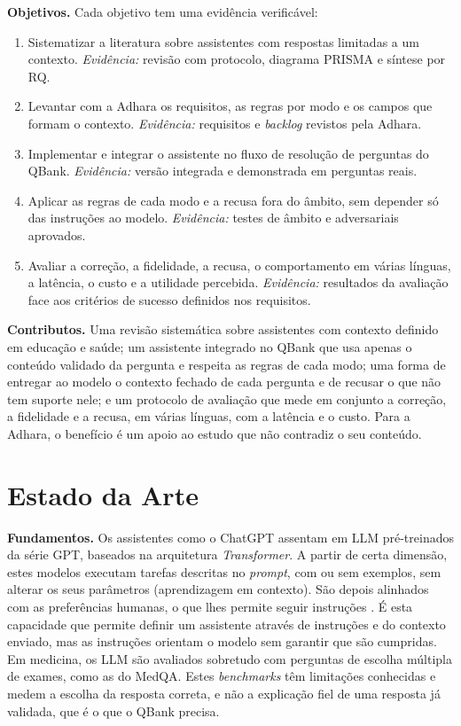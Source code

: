 \documentclass[11pt,a4paper]{article}
\begin{document}
\textbf{Objetivos.} Cada objetivo tem uma evidência verificável:
\begin{enumerate}[label=O\arabic*., leftmargin=1.2cm]
    \item Sistematizar a literatura sobre assistentes com respostas limitadas a um contexto. \emph{Evidência:} revisão com protocolo, diagrama PRISMA e síntese por RQ.
    \item Levantar com a Adhara os requisitos, as regras por modo e os campos que formam o contexto. \emph{Evidência:} requisitos e \emph{backlog} revistos pela Adhara.
    \item Implementar e integrar o assistente no fluxo de resolução de perguntas do QBank. \emph{Evidência:} versão integrada e demonstrada em perguntas reais.
    \item Aplicar as regras de cada modo e a recusa fora do âmbito, sem depender só das instruções ao modelo. \emph{Evidência:} testes de âmbito e adversariais aprovados.
    \item Avaliar a correção, a fidelidade, a recusa, o comportamento em várias línguas, a latência, o custo e a utilidade percebida. \emph{Evidência:} resultados da avaliação face aos critérios de sucesso definidos nos requisitos.
\end{enumerate}

\textbf{Contributos.} Uma revisão sistemática sobre assistentes com contexto definido em educação e saúde; um assistente integrado no QBank que usa apenas o conteúdo validado da pergunta e respeita as regras de cada modo; uma forma de entregar ao modelo o contexto fechado de cada pergunta e de recusar o que não tem suporte nele; e um protocolo de avaliação que mede em conjunto a correção, a fidelidade e a recusa, em várias línguas, com a latência e o custo. Para a Adhara, o benefício é um apoio ao estudo que não contradiz o seu conteúdo.

\section{Estado da Arte}

\textbf{Fundamentos.} Os assistentes como o ChatGPT assentam em LLM pré-treinados da série GPT, baseados na arquitetura \emph{Transformer}. A partir de certa dimensão, estes modelos executam tarefas descritas no \emph{prompt}, com ou sem exemplos, sem alterar os seus parâmetros (aprendizagem em contexto). São depois alinhados com as preferências humanas, o que lhes permite seguir instruções \parencite{wu2023brief}. É esta capacidade que permite definir um assistente através de instruções e do contexto enviado, mas as instruções orientam o modelo sem garantir que são cumpridas. Em medicina, os LLM são avaliados sobretudo com perguntas de escolha múltipla de exames, como as do MedQA. Estes \emph{benchmarks} têm limitações conhecidas \parencite{hu2025advancing} e medem a escolha da resposta correta, e não a explicação fiel de uma resposta já validada, que é o que o QBank precisa.
\end{document}

